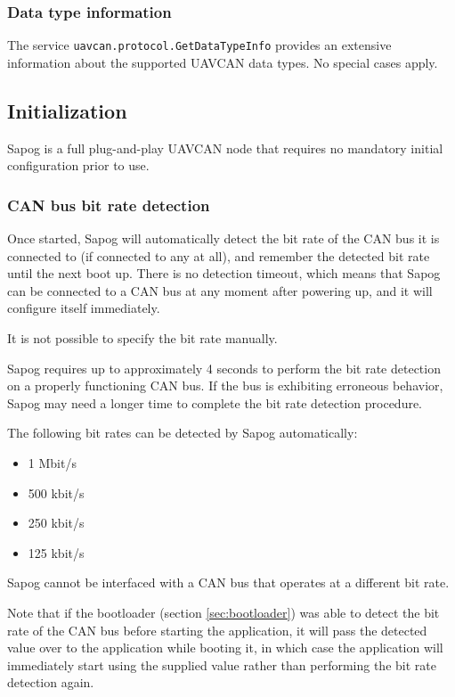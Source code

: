 \documentclass{zubaxdoc}
\begin{document}
\subsubsection{Data type information}

The service \verb|uavcan.protocol.GetDataTypeInfo| provides an extensive information about the
supported UAVCAN data types.
No special cases apply.

\subsection{Initialization}

Sapog is a full plug-and-play UAVCAN node that requires no mandatory initial configuration prior to use.

\subsubsection{CAN bus bit rate detection}

Once started, Sapog will automatically detect the bit rate of the CAN bus it is connected to
(if connected to any at all), and remember the detected bit rate until the next boot up.
There is no detection timeout, which means that Sapog can be connected to a CAN bus at
any moment after powering up, and it will configure itself immediately.

It is not possible to specify the bit rate manually.

Sapog requires up to approximately 4 seconds to perform the bit rate detection on a properly
functioning CAN bus.
If the bus is exhibiting erroneous behavior, Sapog may need a longer time to complete the bit rate
detection procedure.

The following bit rates can be detected by Sapog automatically:
\begin{itemize}
\item 1 Mbit/s
\item 500 kbit/s
\item 250 kbit/s
\item 125 kbit/s
\end{itemize}
Sapog cannot be interfaced with a CAN bus that operates at a different bit rate.

Note that if the bootloader (section \ref{sec:bootloader}) was able to detect the bit rate of the CAN bus
before starting the application,
it will pass the detected value over to the application while booting it,
in which case the application will immediately start using the supplied value rather than
performing the bit rate detection again.
\end{document}
